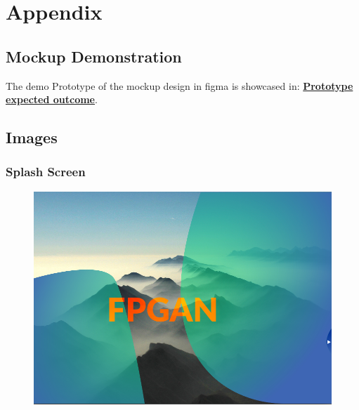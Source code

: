 		\large
			\begingroup
				\let\clearpage\relax
				\chapter*{Appendix}
			\endgroup
        \normalsize
		\section{Mockup Demonstration}
		The demo Prototype of the mockup design in figma is showcased in: \href{https://gitlab.com/khwopafinalyearproject/proposal/-/raw/master/img/chapter_7/FPGAN%20prototype.mkv}{\textbf{Prototype expected outcome}}.
		\section{Images}
		\subsection{Splash Screen} \label{Appendix: Splash Screen}
		\begin{figure}[H] 
			\centering
				\includegraphics[width=1\textwidth]{img/chapter_7/sp.png}
				
		\end{figure}

